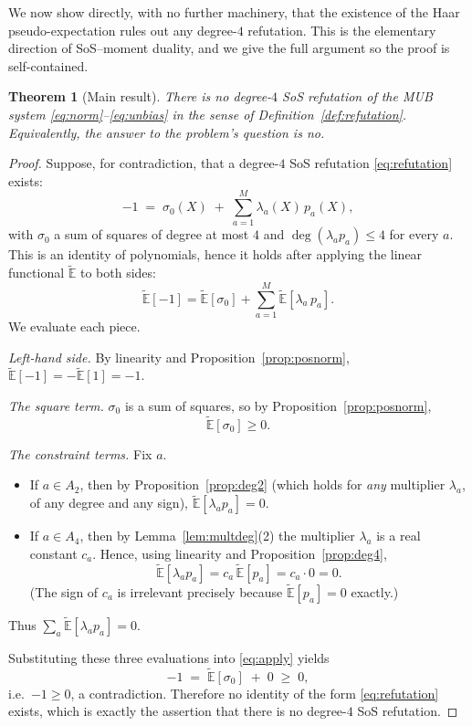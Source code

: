\documentclass{amsart}
\newtheorem{theorem}{Theorem}
\theoremstyle{definition}
\theoremstyle{remark}
\begin{document}
We now show directly, with no further machinery, that the existence of the Haar
pseudo-expectation rules out any degree-$4$ refutation. This is the elementary direction of
SoS--moment duality, and we give the full argument so the proof is self-contained.

\begin{theorem}[Main result]\label{thm:main}
There is no degree-$4$ SoS refutation of the MUB system \eqref{eq:norm}--\eqref{eq:unbias} in
the sense of Definition~\ref{def:refutation}. Equivalently, the answer to the problem's
question is \emph{no}.
\end{theorem}

\begin{proof}
Suppose, for contradiction, that a degree-$4$ SoS refutation \eqref{eq:refutation} exists:
\[
-1\;=\;\sigma_0(X)\;+\;\sum_{a=1}^{M}\lambda_a(X)\,p_a(X),
\]
with $\sigma_0$ a sum of squares of degree at most $4$ and $\deg(\lambda_a p_a)\le4$ for every
$a$. This is an identity of polynomials, hence it holds after applying the linear functional
$\widetilde{\mathbb{E}}$ to both sides:
\begin{equation}\label{eq:apply}
\widetilde{\mathbb{E}}[-1]
=\widetilde{\mathbb{E}}[\sigma_0]
+\sum_{a=1}^{M}\widetilde{\mathbb{E}}[\lambda_a\,p_a].
\end{equation}
We evaluate each piece.

\smallskip
\noindent\emph{Left-hand side.} By linearity and Proposition~\ref{prop:posnorm},
$\widetilde{\mathbb{E}}[-1]=-\widetilde{\mathbb{E}}[1]=-1$.

\smallskip
\noindent\emph{The square term.} $\sigma_0$ is a sum of squares, so by
Proposition~\ref{prop:posnorm},
\[
\widetilde{\mathbb{E}}[\sigma_0]\ge 0 .
\]

\smallskip
\noindent\emph{The constraint terms.} Fix $a$.
\begin{itemize}
\item If $a\in A_2$, then by Proposition~\ref{prop:deg2} (which holds for \emph{any}
multiplier $\lambda_a$, of any degree and any sign), $\widetilde{\mathbb{E}}[\lambda_a p_a]=0$.
\item If $a\in A_4$, then by Lemma~\ref{lem:multdeg}(2) the multiplier $\lambda_a$ is a real
constant $c_a$. Hence, using linearity and Proposition~\ref{prop:deg4},
\[
\widetilde{\mathbb{E}}[\lambda_a p_a]=c_a\,\widetilde{\mathbb{E}}[p_a]=c_a\cdot 0=0 .
\]
(The sign of $c_a$ is irrelevant precisely because $\widetilde{\mathbb{E}}[p_a]=0$ exactly.)
\end{itemize}
Thus $\sum_{a}\widetilde{\mathbb{E}}[\lambda_a p_a]=0$.

\smallskip
Substituting these three evaluations into \eqref{eq:apply} yields
\[
-1\;=\;\widetilde{\mathbb{E}}[\sigma_0]\;+\;0\;\ge\;0 ,
\]
i.e.\ $-1\ge0$, a contradiction. Therefore no identity of the form \eqref{eq:refutation}
exists, which is exactly the assertion that there is no degree-$4$ SoS refutation. \qedhere
\end{proof}
\end{document}
